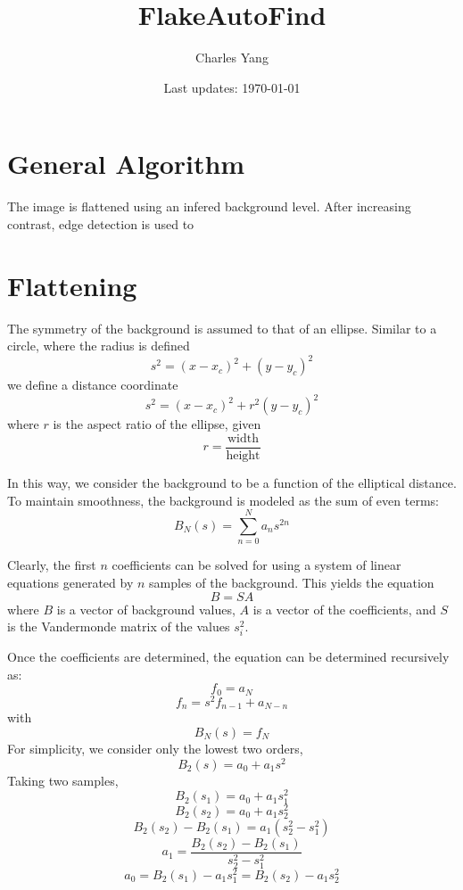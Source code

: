 \documentclass{article}
\title{FlakeAutoFind}
\author{Charles Yang}
\date{Last updates: \today}
\begin{document}
\maketitle
\setcounter{tocdepth}{1}
\tableofcontents

\section{General Algorithm}
The image is flattened using an infered background level. After increasing contrast, edge detection is used to 

\section{Flattening}
The symmetry of the background is assumed to that of an ellipse. Similar to a circle, where the radius is defined
\[s^2=(x-x_c)^2+(y-y_c)^2\]
we define a distance coordinate
\[s^2=(x-x_c)^2+r^2(y-y_c)^2\]
where \(r\) is the aspect ratio of the ellipse, given
\[r = \frac{\text{width}}{\text{height}}\]

In this way, we consider the background to be a function of the elliptical distance. To maintain smoothness, the background is modeled as the sum of even terms:
\[B_N(s)=\sum_{n=0}^N a_ns^{2n}\]

Clearly, the first \(n\) coefficients can be solved for using a system of linear equations generated by \(n\) samples of the background. This yields the equation
\[B = SA\]
where \(B\) is a vector of background values, \(A\) is a vector of the coefficients, and \(S\) is the Vandermonde matrix of the values \(s_i^2\).



Once the coefficients are determined, the equation can be determined recursively as:
\[f_0=a_N\]
\[f_{n} =s^2f_{n-1} +a_{N-n}\]
with
\[B_N(s)=f_N\]
For simplicity, we consider only the lowest two orders, 
\[B_2(s) = a_0+a_1s^2\]
Taking two samples,
\[B_2(s_1) = a_0+a_1s_1^2\]
\[B_2(s_2) = a_0+a_1s_2^2\]
\[B_2(s_2)-B_2(s_1)=a_1(s_2^2-s_1^2)\]
\[a_1=\frac{B_2(s_2)-B_2(s_1)}{s_2^2-s_1^2}\]
\[a_0=B_2(s_1)-a_1s_1^2=B_2(s_2)-a_1s_2^2\]
\end{document}
